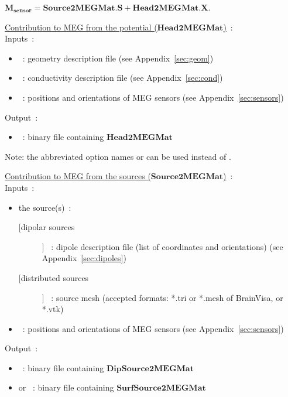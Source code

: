  $\mathbf{M_{sensor}} = \mathbf{Source2MEGMat} . \mathbf{S} + \mathbf{Head2MEGMat}.\mathbf{X}$.

\medskip

\noindent
\underline{Contribution to MEG from the potential ($\mathbf{Head2MEGMat}$)}~:\\
Inputs~:
\begin{itemize}
    \item {}~: geometry description file (see Appendix~\ref{sec:geom})
    \item {}~: conductivity description file (see Appendix~\ref{sec:cond})
    \item {}~: positions and orientations of MEG sensors (see Appendix~\ref{sec:sensors})
\end{itemize}
Output~:
\begin{itemize}
    \item {}~: binary file containing $\mathbf{Head2MEGMat}$
\end{itemize}

\medskip

\noindent
{}
\medskip
Note:  the abbreviated option names  or  can be used instead of .

\bigskip

\noindent
\underline{Contribution to MEG from the sources ($\mathbf{Source2MEGMat}$)}~:\\
Inputs~:
\begin{itemize}
    \item the source(s)~:
    \begin{description}
        \item [[dipolar sources]] ~:  dipole description file (list of coordinates and orientations) (see Appendix~\ref{sec:dipoles}) 
        \item [[distributed sources]] ~:  source mesh (accepted formats:  *.tri or *.mesh of BrainVisa, or *.vtk) 
    \end{description}
    \item {}~: positions and orientations of MEG sensors (see Appendix~\ref{sec:sensors})
\end{itemize}
Output~: 
\begin{itemize}
    \item {}~: binary file containing $\mathbf{DipSource2MEGMat}$ \\
\item or ~: binary file containing $\mathbf{SurfSource2MEGMat}$ 
\end{itemize}

